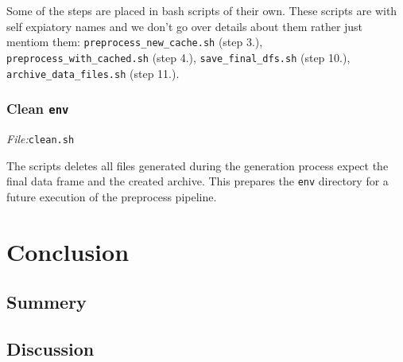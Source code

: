\documentclass[12pt,a4paper,twoside]{scrartcl}
\numberwithin{equation}{section}
\begin{document}
Some of the steps are placed in bash scripts of their own. These scripts are with self expiatory names and we don't go over details about them rather just mentiom them: \texttt{preprocess\_new\_cache.sh} (step 3.), \texttt{preprocess\_with\_cached.sh} (step 4.), \texttt{save\_final\_dfs.sh} (step 10.), \texttt{archive\_data\_files.sh} (step 11.).


\subsubsection{Clean \texttt{env}}
\label{sec:script-clean}
\noindent\emph{File:}\texttt{clean.sh}

The scripts deletes all files  generated during the generation process expect the final data frame and the created archive. This prepares the \texttt{env} directory for a future execution of the preprocess pipeline.


\section{Conclusion}
\label{sec:conclusion}
\subsection{Summery}
\subsection{Discussion}



\clearpage


\end{document}
